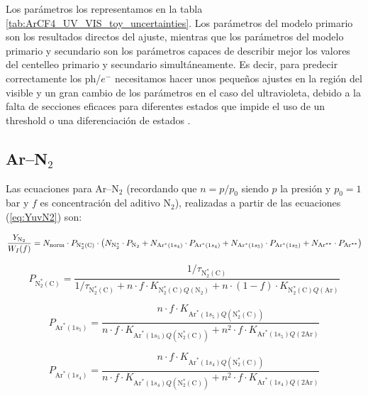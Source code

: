 \documentclass[12pt,a4paper]{article}
\newcommand{\N}{\mathrm{N}}
\newcommand{\Ar}{\mathrm{Ar}}
\newcommand{\NC}{\mathrm{N}_2^*(\mathrm{C})}
\newcommand{\norma}{\mathrm{norm}}
\DeclareRobustCommand{\ArOneSFour}{\ensuremath{\mathrm{Ar}^*(1s_4)}}
\DeclareRobustCommand{\ArOneSFive}{\ensuremath{\mathrm{Ar}^*(1s_5)}}
\begin{document}
Los parámetros los representamos en la tabla \ref{tab:ArCF4_UV_VIS_toy_uncertainties}. Los parámetros del modelo primario son los resultados directos del ajuste, mientras que los parámetros del modelo primario y secundario son los parámetros capaces de describir mejor los valores del centelleo primario y secundario simultáneamente. Es decir, para predecir correctamente los ph/$e^-$ necesitamos hacer unos pequeños ajustes en la región del visible y un gran cambio de los parámetros en el caso del ultravioleta, debido a la falta de secciones eficaces para diferentes estados que impide el uso de un threshold o una diferenciación de estados .






\subsection{Ar--N$_2$}

Las ecuaciones para Ar--N$_2$ (recordando que $n=p/p_0$ siendo $p$ la presión y $p_0=1$ bar y $f$ es concentración del aditivo $\N_2$), realizadas a partir de las ecuaciones (\ref{eq:YuvN2}) son: 


\begin{equation*}
    \frac{Y_{\N_2}}{W_I(f)} 
    =
    {N_{\norma}}
    \cdot
    P_{\NC}
    \cdot
    \pqty{
      N_{\N_2^*}\cdot P_{\N_2}
      +
      N_{\ArOneSFour}\cdot P_{\ArOneSFour}
      +
      N_{\ArOneSFive}\cdot P_{\ArOneSFive}
      + N_{\Ar^{**}} \cdot P_{\Ar^{**}}
    }
\end{equation*}

\begin{equation}
    P_{\NC}
    =
    \frac{1/\tau_{\NC}}{
    1/\tau_{\NC}
    +
    n \cdot f \cdot K_{\NC Q(\N_2)}
    +
    n \cdot (1-f) \cdot K_{\NC Q(\Ar)}}
\end{equation}

\begin{equation}
    P_{\ArOneSFive}
    =
    \frac{n \cdot f \cdot K_{\ArOneSFive Q(\NC)}}{
    n \cdot f \cdot K_{\ArOneSFive Q(\NC)}
    +
    n^2 \cdot f \cdot K_{\ArOneSFive Q(2\Ar)}}
\end{equation}

\begin{equation}
    P_{\ArOneSFour}
    =
    \frac{n \cdot f \cdot K_{\ArOneSFour Q(\NC)}}{
    n \cdot f \cdot K_{\ArOneSFour Q(\NC)}
    +
    n^2 \cdot f \cdot K_{\ArOneSFour Q(2\Ar)}}
\end{equation}
\end{document}
